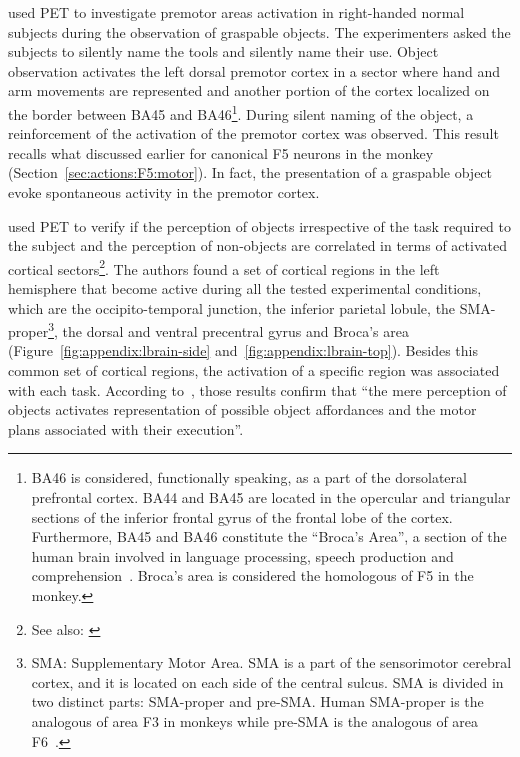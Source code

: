 \citet{grafton.etal:1997} used PET to investigate premotor areas activation
in right-handed normal subjects during the observation of graspable objects.
The experimenters asked the subjects to silently name the tools
and silently name their use.
Object observation activates the left dorsal premotor cortex in a sector where
hand and arm movements are represented and another portion of the cortex
localized on the border between BA45 and BA46\footnote{BA46 is 
considered, functionally speaking, as a part of the dorsolateral prefrontal 
cortex. BA44 and BA45 are located in the opercular and triangular sections of
the inferior frontal gyrus of the frontal lobe of the cortex. Furthermore, BA45
and BA46 constitute the ``Broca's Area'', a section of the human brain involved
in language processing, speech production and
comprehension~\citep{kandel.schwartz.jessel:2000}. Broca's area is
considered the homologous of F5 in the monkey.}. 
During silent naming of the object, a reinforcement of the activation of the 
premotor cortex was observed.
This result recalls what discussed earlier for canonical F5 neurons in the
monkey (Section~\ref{sec:actions:F5:motor}).
In fact, the presentation of a graspable object evoke spontaneous activity in 
the premotor cortex.

\citet{grezes.decety:2002} used PET to verify if the perception of objects 
irrespective of the task required to the subject and the perception of
non-objects are correlated in terms of activated cortical
sectors\footnote{See also: \citet{grezes.etal:1998}}.
The authors found a set of cortical regions in the left hemisphere that become
active during all the tested experimental conditions, which are
the occipito-temporal junction, the inferior parietal lobule, 
the SMA-proper\footnote{SMA: Supplementary Motor Area. SMA is a part of the
sensorimotor cerebral cortex, and it is located on each side of the central
sulcus. SMA is divided in two distinct parts: SMA-proper and pre-SMA.
Human SMA-proper is the analogous of area F3 in monkeys while pre-SMA is the 
analogous of area F6~\citep{kandel.schwartz.jessel:2000}.},
the dorsal and ventral precentral gyrus and Broca's area
(Figure~\ref{fig:appendix:lbrain-side} and~\ref{fig:appendix:lbrain-top}).
Besides this common set of cortical regions,
the activation of a specific region was associated with each task.
According to~\citet{fadiga.etal:PRESS}, those results confirm that 
``the mere perception of objects activates representation of possible object 
affordances and the motor plans associated with their execution''.

